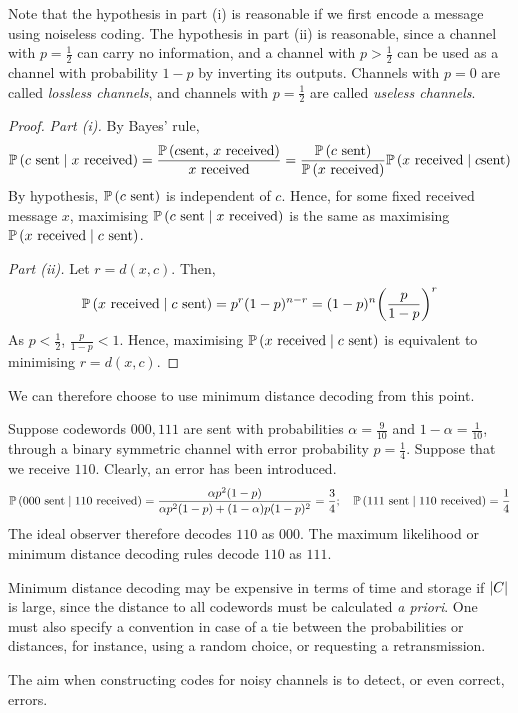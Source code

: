 Note that the hypothesis in part (i) is reasonable if we first encode a message using noiseless coding.
The hypothesis in part (ii) is reasonable, since a channel with \( p = \frac{1}{2} \) can carry no information, and a channel with \( p > \frac{1}{2} \) can be used as a channel with probability \( 1 - p \) by inverting its outputs.
Channels with \( p = 0 \) are called \emph{lossless channels}, and channels with \( p = \frac{1}{2} \) are called \emph{useless channels}.
\begin{proof}
    \emph{Part (i).}
    By Bayes' rule,
    \[ \mathbb{P}\left({c \text{ sent} \mid x \text{ received}}\right) = \frac{\mathbb{P}\left({c \text{sent, } x \text{ received}}\right)}{x \text{ received}} = \frac{\mathbb{P}\left({c \text{ sent}}\right)}{\mathbb{P}\left({x \text{ received}}\right)} \mathbb{P}\left({x \text{ received} \mid c \text{sent}}\right) \]
    By hypothesis, \( \mathbb{P}\left({c \text{ sent}}\right) \) is independent of \( c \).
    Hence, for some fixed received message \( x \), maximising \( \mathbb{P}\left({c \text{ sent} \mid x \text{ received}}\right) \) is the same as maximising \( \mathbb{P}\left({x \text{ received} \mid c \text{ sent}}\right) \).
    
    \emph{Part (ii).}
    Let \( r = d(x,c) \).
    Then,
    \[ \mathbb{P}\left({x \text{ received} \mid c \text{ sent}}\right) = p^r (1-p)^{n-r} = (1-p)^n \qty(\frac{p}{1-p})^r \]
    As \( p < \frac{1}{2} \), \( \frac{p}{1-p} < 1 \).
    Hence, maximising \( \mathbb{P}\left({x \text{ received} \mid c \text{ sent}}\right) \) is equivalent to minimising \( r = d(x,c) \).
\end{proof}
We can therefore choose to use minimum distance decoding from this point.
\begin{example}
    Suppose codewords \( 000, 111 \) are sent with probabilities \( \alpha = \frac{9}{10} \) and \( 1 - \alpha = \frac{1}{10} \), through a binary symmetric channel with error probability \( p = \frac{1}{4} \).
    Suppose that we receive \( 110 \).
    Clearly, an error has been introduced.
    \[ \mathbb{P}\left({000 \text{ sent} \mid 110 \text{ received}}\right) = \frac{\alpha p^2 (1-p)}{\alpha p^2 (1-p) + (1-\alpha)p(1-p)^2} = \frac{3}{4};\quad \mathbb{P}\left({111 \text{ sent} \mid 110 \text{ received}}\right) = \frac{1}{4} \]
    The ideal observer therefore decodes \( 110 \) as \( 000 \).
    The maximum likelihood or minimum distance decoding rules decode \( 110 \) as \( 111 \).
\end{example}
\begin{remark}
    Minimum distance decoding may be expensive in terms of time and storage if \( \abs{C} \) is large, since the distance to all codewords must be calculated \emph{a priori}.
    One must also specify a convention in case of a tie between the probabilities or distances, for instance, using a random choice, or requesting a retransmission.
\end{remark}
The aim when constructing codes for noisy channels is to detect, or even correct, errors.

